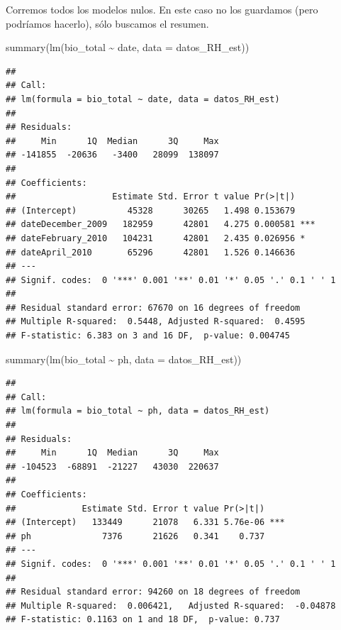 \documentclass[
]{book}
\newenvironment{Shaded}{\begin{snugshade}}{\end{snugshade}}
\newcommand{\AttributeTok}[1]{\textcolor[rgb]{0.77,0.63,0.00}{#1}}
\newcommand{\FunctionTok}[1]{\textcolor[rgb]{0.00,0.00,0.00}{#1}}
\newcommand{\NormalTok}[1]{#1}
\newcommand{\SpecialCharTok}[1]{\textcolor[rgb]{0.00,0.00,0.00}{#1}}
\begin{document}
Corremos todos los modelos nulos. En este caso no los guardamos (pero podríamos hacerlo), sólo buscamos el resumen.

\begin{Shaded}
\begin{Highlighting}[]
\FunctionTok{summary}\NormalTok{(}\FunctionTok{lm}\NormalTok{(bio\_total }\SpecialCharTok{\textasciitilde{}}\NormalTok{ date, }\AttributeTok{data =}\NormalTok{ datos\_RH\_est))}
\end{Highlighting}
\end{Shaded}

\begin{verbatim}
## 
## Call:
## lm(formula = bio_total ~ date, data = datos_RH_est)
## 
## Residuals:
##     Min      1Q  Median      3Q     Max 
## -141855  -20636   -3400   28099  138097 
## 
## Coefficients:
##                   Estimate Std. Error t value Pr(>|t|)    
## (Intercept)          45328      30265   1.498 0.153679    
## dateDecember_2009   182959      42801   4.275 0.000581 ***
## dateFebruary_2010   104231      42801   2.435 0.026956 *  
## dateApril_2010       65296      42801   1.526 0.146636    
## ---
## Signif. codes:  0 '***' 0.001 '**' 0.01 '*' 0.05 '.' 0.1 ' ' 1
## 
## Residual standard error: 67670 on 16 degrees of freedom
## Multiple R-squared:  0.5448, Adjusted R-squared:  0.4595 
## F-statistic: 6.383 on 3 and 16 DF,  p-value: 0.004745
\end{verbatim}

\begin{Shaded}
\begin{Highlighting}[]
\FunctionTok{summary}\NormalTok{(}\FunctionTok{lm}\NormalTok{(bio\_total }\SpecialCharTok{\textasciitilde{}}\NormalTok{ ph, }\AttributeTok{data =}\NormalTok{ datos\_RH\_est))}
\end{Highlighting}
\end{Shaded}

\begin{verbatim}
## 
## Call:
## lm(formula = bio_total ~ ph, data = datos_RH_est)
## 
## Residuals:
##     Min      1Q  Median      3Q     Max 
## -104523  -68891  -21227   43030  220637 
## 
## Coefficients:
##             Estimate Std. Error t value Pr(>|t|)    
## (Intercept)   133449      21078   6.331 5.76e-06 ***
## ph              7376      21626   0.341    0.737    
## ---
## Signif. codes:  0 '***' 0.001 '**' 0.01 '*' 0.05 '.' 0.1 ' ' 1
## 
## Residual standard error: 94260 on 18 degrees of freedom
## Multiple R-squared:  0.006421,   Adjusted R-squared:  -0.04878 
## F-statistic: 0.1163 on 1 and 18 DF,  p-value: 0.737
\end{verbatim}
\end{document}
